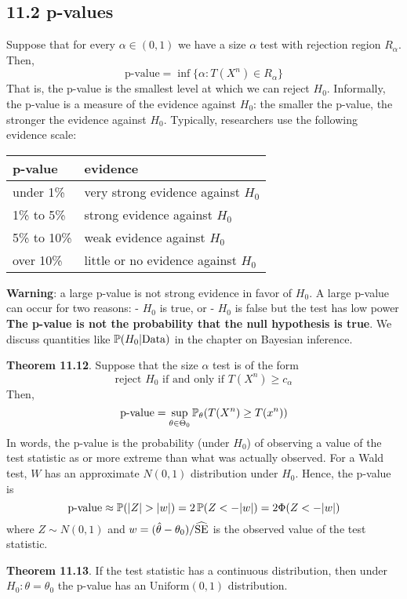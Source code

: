 \subsection*{11.2 p-values}\label{p-values}
Suppose that for every \(\alpha \in (0, 1)\) we have a size \(\alpha\)
test with rejection region \(R_\alpha\). Then,
\[
\text{p-value} = \inf \Big\{ \alpha : T(X^{n}) \in R_\alpha \Big\}
\]
That is, the p-value is the smallest level at which we can reject
\(H_{0}\).
Informally, the p-value is a measure of the evidence against \(H_{0}\):
the smaller the p-value, the stronger the evidence against \(H_{0}\).
Typically, researchers use the following evidence scale:
\begin{table}[H]
\centering
\begin{tabular}{@{}ll@{}}
\toprule
p-value & evidence \\
\midrule
under 1\% & very strong evidence against \(H_{0}\) \\
1\% to 5\% & strong evidence against \(H_{0}\) \\
5\% to 10\% & weak evidence against \(H_{0}\) \\
over 10\% & little or no evidence against \(H_{0}\) \\
\bottomrule
\end{tabular}
\end{table}
\textbf{Warning}: a large p-value is not strong evidence in favor of
\(H_{0}\). A large p-value can occur for two reasons: - \(H_{0}\) is true,
or - \(H_{0}\) is false but the test has low power
\textbf{The p-value is not the probability that the null hypothesis is
true}. We discuss quantities like \(\operatorname{\mathbb{P}}(H_{0} | \text{Data})\) in
the chapter on Bayesian inference.

\textbf{Theorem 11.12}. Suppose that the size \(\alpha\) test is of the
form
\[
\text{reject } H_{0} \text{ if and only if } T(X^{n}) \geq c_\alpha
\]
Then,
\[
\text{p-value} = \sup_{\theta \in \Theta_{0}} \PROB_\theta \left(T(X^{n}) \geq T(x^{n}) \right)
\]
In words, the p-value is the probability (under \(H_{0}\)) of observing a
value of the test statistic as or more extreme than what was actually
observed.
For a Wald test, \(W\) has an approximate \(N(0, 1)\) distribution under
\(H_{0}\). Hence, the p-value is
\[
\text{p-value} \approx \operatorname{\mathbb{P}}(|Z| > |w|) = 2\operatorname{\mathbb{P}}(Z < -|w|) = 2 \Phi(Z < -|w|)
\]
where \(Z \sim N(0, 1)\) and
\(w = (\hat{\theta} - \theta_{0}) / \widehat{\operatorname{\mathrm{SE}}}\) is the observed
value of the test statistic.

\textbf{Theorem 11.13}. If the test statistic has a continuous
distribution, then under \(H_{0}: \theta = \theta_{0}\) the p-value has an
\(\text{Uniform}(0, 1)\) distribution.

